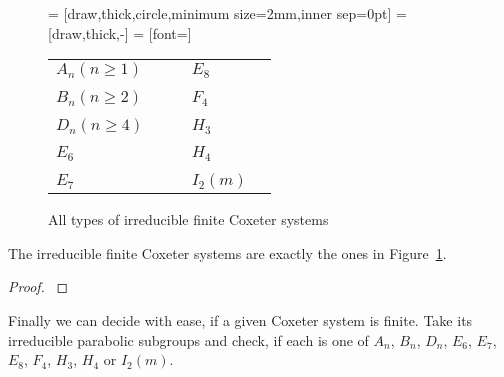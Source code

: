 \begin{figure}
	\centering
	 = [draw,thick,circle,minimum size=2mm,inner sep=0pt]
	 = [draw,thick,-]
	 = [font=\small]

	\begin{tabular}{MMcMM}
	$A_n (n \geq 1)$
	&
	\An
	&
	\hspace*{\cgpadh}
	&
	$E_8$
	&
	\Eeight
	\\
	\vspace*{\cgpadv}
	\\
	$B_n (n \geq 2)$
	&
	\Bn
	&
	\hspace*{\cgpadh}
	&
	$F_4$
	&
	\Ffour
	\\
	\vspace*{\cgpadv}
	\\
	$D_n (n \geq 4)$
	&
	\Dn
	&
	\hspace*{\cgpadh}
	&
	$H_3$
	&
	\Hthree
	\\
	\vspace*{\cgpadv}
	\\
	$E_6$
	&
	\Esix
	&
	\hspace*{\cgpadh}
	&
	$H_4$
	&
	\Hfour
	\\
	\vspace*{\cgpadv}
	\\
	$E_7$
	&
	\Eseven
	&
	\hspace*{\cgpadh}
	&
	$I_2(m)$
	&
	\Itwom
	\end{tabular}
	\caption{All types of irreducible finite Coxeter systems}
	\label{fig:finite-coxeter-systems}
\end{figure}

\begin{theo}
	The irreducible finite Coxeter systems are exactly the ones in Figure~\ref{fig:finite-coxeter-systems}.

	\begin{proof}
		\cite[Theorem 6.4]{humphreys:coxeter}
	\end{proof}
\end{theo}

Finally we can decide with ease, if a given Coxeter system is finite. Take its irreducible parabolic subgroups and check, if each is one of $A_n$, $B_n$, $D_n$, $E_6$, $E_7$, $E_8$, $F_4$, $H_3$, $H_4$ or $I_2(m)$.